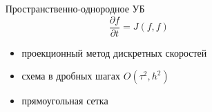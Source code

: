 \documentclass[mathserif]{beamer} %
\newcommand{\pder}[2][]{\frac{\partial#1}{\partial#2}}
\newcommand{\OO}[1]{O(#1)}
\begin{document}
\begin{frame}
\begin{columns}[T]
\begin{column}{5cm}
        \end{column}
        \pause
        \begin{column}{6.5cm}
            \begin{block}{Пространственно-однородное УБ}
                \begin{equation}
                    \pder[f]{t} = J(f,f)
                \end{equation}
                \vspace{-15pt}
                \begin{itemize}
                    \item проекционный метод дискретных скоростей
                    \item схема в дробных шагах \(\OO{\tau^2, h^2}\)
                    \item прямоугольная сетка
                \end{itemize}
            \end{block}
        \end{column}
    \end{columns}
\end{frame}
\end{document}

